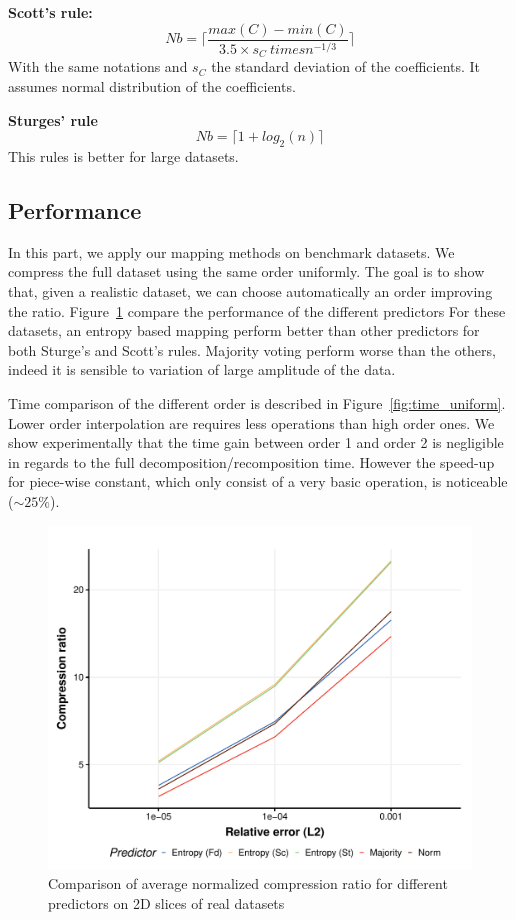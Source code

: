 \documentclass[conference]{IEEEtran}
\theoremstyle{remark}
\begin{document}
\textbf{Scott's rule:}
\[Nb =\lceil \frac{max(C)-min(C)}{3.5 \times s_C \ times n^{-1/3}} \rceil \]
 With the same notations and $s_C$ the standard deviation of the coefficients.
 It assumes normal distribution of the coefficients.

 \textbf{Sturges' rule}
 \[Nb = \lceil 1+log_2(n) \rceil \]
This rules is better for large datasets.


\subsection{Performance}

In this part, we apply our mapping methods on benchmark datasets.
We compress the full dataset using the same order uniformly.
The goal is to show that, given a realistic dataset, we can choose automatically an order improving the ratio.
Figure~\ref{fig:pred2d} compare the performance of the different predictors
For these datasets, an entropy based mapping perform better than other predictors for both Sturge's and Scott's  rules. Majority voting perform worse than the others, indeed it is sensible to variation of large amplitude of the data.

Time comparison of the different order is described in Figure~\ref{fig:time_uniform}. Lower order interpolation are requires less operations than high order ones. We show experimentally that the time gain between order 1 and order 2 is negligible in regards to the full decomposition/recomposition time. However the speed-up for piece-wise constant, which only consist of a very basic operation, is noticeable ($\sim25\%$).


\begin{figure}[h]

    \centering
    \includegraphics[width=\linewidth]{Img/predictors_2d.pdf}
    \caption{Comparison of average normalized compression ratio for different predictors on 2D slices of real datasets}
    \label{fig:pred2d}
\end{figure}
\end{document}
